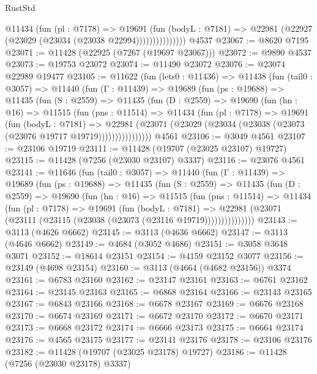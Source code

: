 \begin{lexlean}{RustStd}
\begin{coremodule}
                    @11434
                      (fun (pl : @7178) =>
                      @19691
                        (fun (bodyL : @7181) =>
                        @22981 (@22927 (@23029 (@23034 (@23038 @22994)))))))))))))))
    @4537
@23067 := @8620 @7195
@23071 := @11428 (@22925 (@7267 (@19697 @23067)))
@23072 := @9890 @4537
@23073 := @19753 @23072
@23074 := @11490 @23072
@23076 := @23074 @22989 @19477
@23105 := @11622
    (fun (lets0 : @11436) =>
    @11438
      (fun (tail0 : @3057) =>
      @11440
        (fun (Γ : @11439) =>
        @19689
          (fun (ps : @19688) =>
          @11435
            (fun (S : @2559) =>
            @11435
              (fun (D : @2559) =>
              @19690
                (fun (hn : @16) =>
                @11515
                  (fun (pns : @11514) =>
                  @11434
                    (fun (pl : @7178) =>
                    @19691
                      (fun (bodyL : @7181) =>
                      @22981
                        (@23071
                          (@23029 (@23034 (@23038 (@23073 (@23076 @19717 @19719))))))))))))))))
    @4561
@23106 := @3049 @4561
@23107 := @23106 @19719
@23111 := @11428 (@19707 (@23025 @23107) @19727)
@23115 := @11428 (@7256 (@23030 @23107) @3337)
@23116 := @23076 @4561
@23141 := @11646
    (fun (tail0 : @3057) =>
    @11440
      (fun (Γ : @11439) =>
      @19689
        (fun (ps : @19688) =>
        @11435
          (fun (S : @2559) =>
          @11435
            (fun (D : @2559) =>
            @19690
              (fun (hn : @16) =>
              @11515
                (fun (pns : @11514) =>
                @11434
                  (fun (pl : @7178) =>
                  @19691
                    (fun (bodyL : @7181) =>
                    @22981 (@23071 (@23111 (@23115 (@23038 (@23073 (@23116 @19719)))))))))))))))
@23143 := @3113 (@4626 @6662)
@23145 := @3113 (@4636 @6662)
@23147 := @3113 (@4646 @6662)
@23149 := @4684 (@3052 @4686)
@23151 := @3058 @3648 @3071
@23152 := @18614 @23151
@23154 := @4159 @23152 @3077
@23156 := @23149 (@4698 @23154)
@23160 := @3113 (@4664 (@4682 @23156)) @3374
@23161 := @6783 @23160
@23162 := @23147 @23161
@23163 := @6761 @23162
@23164 := @23145 @23163
@23165 := @6868 @23164
@23166 := @23143 @23165
@23167 := @6843 @23166
@23168 := @6678 @23167
@23169 := @6676 @23168
@23170 := @6674 @23169
@23171 := @6672 @23170
@23172 := @6670 @23171
@23173 := @6668 @23172
@23174 := @6666 @23173
@23175 := @6664 @23174
@23176 := @4565 @23175
@23177 := @23141 @23176
@23178 := @23106 @23176
@23182 := @11428 (@19707 (@23025 @23178) @19727)
@23186 := @11428 (@7256 (@23030 @23178) @3337)

\end{coremodule}
\end{lexlean}
